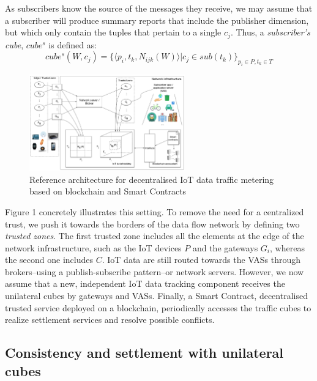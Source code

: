 \documentclass[chi_draft]{sigchi}
\begin{document}
As subscribers know the source of the messages they receive, we may assume that a subscriber will produce summary reports that include the publisher dimension, but which only contain the tuples that pertain to a single $c_j$. Thus, a \textit{subscriber's cube}, $ \mathit{cube^s} $ is defined as:
\[
\mathit{cube^s}(W, c_j)  =  \{ \langle p_i, t_k, N_{ijk}(W) \rangle | c_j \in \mathit{sub}(t_k)\}_{p_i \in P, t_k \in T}
\]

\begin{figure}[!ht]
	\centering
	\includegraphics[width=0.6\textwidth]{figures/IoT-tracking-arch-2}
	\caption{Reference architecture for decentralised IoT data traffic metering based on blockchain and Smart Contracts}
	\label{fig:iot-tracking-arch-2}
\end{figure}

Figure 1 concretely illustrates this setting. To remove the need for a centralized trust, we push it towards the borders of the data flow network by defining two \textit{trusted zones}.
The first trusted zone includes all the elements at the edge of the network infrastructure, such as the IoT devices $P$ and the gateways $ G_i $, whereas the second one includes $ C $.
IoT data are still routed towards the VASs through brokers--using a publish-subscribe pattern--or network servers.
However, we now assume that a new, independent IoT data tracking component receives the unilateral cubes by gateways and VASs.
Finally, a Smart Contract, decentralised trusted service deployed on a blockchain, periodically accesses the traffic cubes to realize settlement services and resolve possible conflicts.

\subsection{Consistency and settlement with unilateral cubes}
\end{document}
